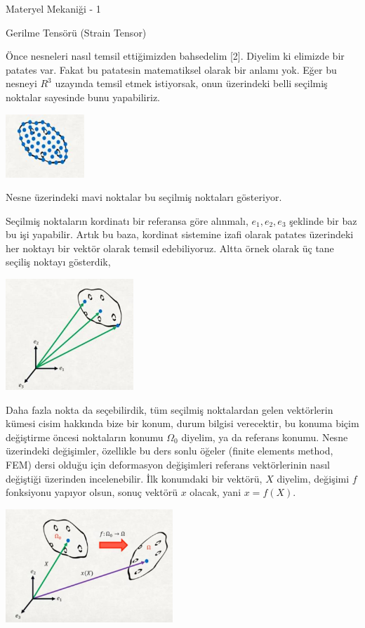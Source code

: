 \documentclass[12pt,fleqn]{article}\usepackage{../../common}
\begin{document}
Materyel Mekaniği - 1

Gerilme Tensörü (Strain Tensor) 

Önce nesneleri nasıl temsil ettiğimizden bahsedelim [2]. Diyelim ki elimizde bir
patates var. Fakat bu patatesin matematiksel olarak bir anlamı yok. Eğer bu
nesneyi $R^3$ uzayında temsil etmek istiyorsak, onun üzerindeki belli seçilmiş
noktalar sayesinde bunu yapabiliriz.

\includegraphics[width=8em]{phy_020_strs_01_01.jpg}

Nesne üzerindeki mavi noktalar bu seçilmiş noktaları gösteriyor.

Seçilmiş noktaların kordinatı bir referansa göre alınmalı, $e_1,e_2,e_3$
şeklinde bir baz bu işi yapabilir. Artık bu baza, kordinat sistemine izafi
olarak patates üzerindeki her noktayı bir vektör olarak temsil edebiliyoruz.
Altta örnek olarak üç tane seçiliş noktayı gösterdik,

\includegraphics[width=13em]{phy_020_strs_01_02.jpg}

Daha fazla nokta da seçebilirdik, tüm seçilmiş noktalardan gelen vektörlerin
kümesi cisim hakkında bize bir konum, durum bilgisi verecektir, bu konuma biçim
değiştirme öncesi noktaların konumu $\Omega_0$ diyelim, ya da referans konumu.
Nesne üzerindeki değişimler, özellikle bu ders sonlu öğeler (finite elements
method, FEM) dersi olduğu için deformasyon değişimleri referans vektörlerinin
nasıl değiştiği üzerinden incelenebilir. İlk konumdaki bir vektörü, $X$ diyelim,
değişimi $f$ fonksiyonu yapıyor olsun, sonuç vektörü $x$ olacak, yani $x =
f(X)$.

\includegraphics[width=17em]{phy_020_strs_01_03.jpg}
\end{document}
